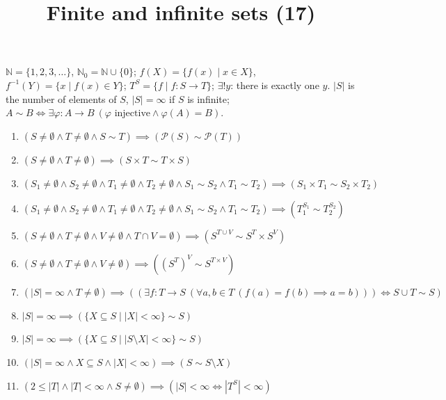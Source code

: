 \documentclass[11pt,a4paper]{article}
\title{Finite and infinite sets (17)}
\author{}
\date{}
\begin{document}
\maketitle
$\mathbb{N} = \{1, 2, 3, \ldots\}$, $\mathbb{N}_{0} = \mathbb{N} \cup \{0\}$; $f(X) = \{f(x) \mid x \in X\}$, $f^{-1}(Y) = \{x \mid f(x) \in Y\}$; $T^{S} = \{f \mid f \colon S \to T\}$; $\exists! y$: there is exactly one $y$. $|S|$ is the number of elements of $S$, $|S| = \infty$ if $S$ is infinite; $A \sim B \iff \exists \varphi \colon A \to B\ (\varphi \text{ injective} \land \varphi(A) = B)$.

\begin{enumerate}
\item $\displaystyle (S \neq \emptyset \land T \neq \emptyset \land S \sim T) \implies (\mathcal{P}(S) \sim \mathcal{P}(T))$
\item $\displaystyle (S \neq \emptyset \land T \neq \emptyset) \implies (S \times T \sim T \times S)$
\item $\displaystyle (S_{1} \neq \emptyset \land S_{2} \neq \emptyset \land T_{1} \neq \emptyset \land T_{2} \neq \emptyset \land S_{1} \sim S_{2} \land T_{1} \sim T_{2}) \implies (S_{1} \times T_{1} \sim S_{2} \times T_{2})$
\item $\displaystyle (S_{1} \neq \emptyset \land S_{2} \neq \emptyset \land T_{1} \neq \emptyset \land T_{2} \neq \emptyset \land S_{1} \sim S_{2} \land T_{1} \sim T_{2}) \implies (T_{1}^{S_{1}} \sim T_{2}^{S_{2}})$
\item $\displaystyle (S \neq \emptyset \land T \neq \emptyset \land V \neq \emptyset \land T \cap V = \emptyset) \implies (S^{T \cup V} \sim S^{T} \times S^{V})$
\item $\displaystyle (S \neq \emptyset \land T \neq \emptyset \land V \neq \emptyset) \implies ((S^{T})^{V} \sim S^{T \times V})$
\item $\displaystyle (|S| = \infty \land T \neq \emptyset) \implies ((\exists f \colon T \to S\ (\forall a, b \in T\ (f(a) = f(b) \implies a = b))) \iff S \cup T \sim S)$
\item $\displaystyle |S| = \infty \implies (\{X \subseteq S \mid |X| < \infty\} \sim S)$
\item $\displaystyle |S| = \infty \implies (\{X \subseteq S \mid |S \setminus X| < \infty\} \sim S)$
\item $\displaystyle (|S| = \infty \land X \subseteq S \land |X| < \infty) \implies (S \sim S \setminus X)$
\item $\displaystyle (2 \le |T| \land |T| < \infty \land S \neq \emptyset) \implies (|S| < \infty \iff |T^{S}| < \infty)$

\end{enumerate}
\end{document}

